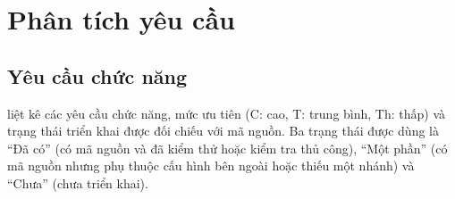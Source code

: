 \section{Phân tích yêu cầu}\label{sec:requirements}

\subsection{Yêu cầu chức năng}

 liệt kê các yêu cầu chức năng, mức ưu tiên (C: cao, T: trung bình, Th: thấp) và trạng thái triển khai được đối chiếu với mã nguồn. Ba trạng thái được dùng là ``Đã có'' (có mã nguồn và đã kiểm thử hoặc kiểm tra thủ công), ``Một phần'' (có mã nguồn nhưng phụ thuộc cấu hình bên ngoài hoặc thiếu một nhánh) và ``Chưa'' (chưa triển khai).

